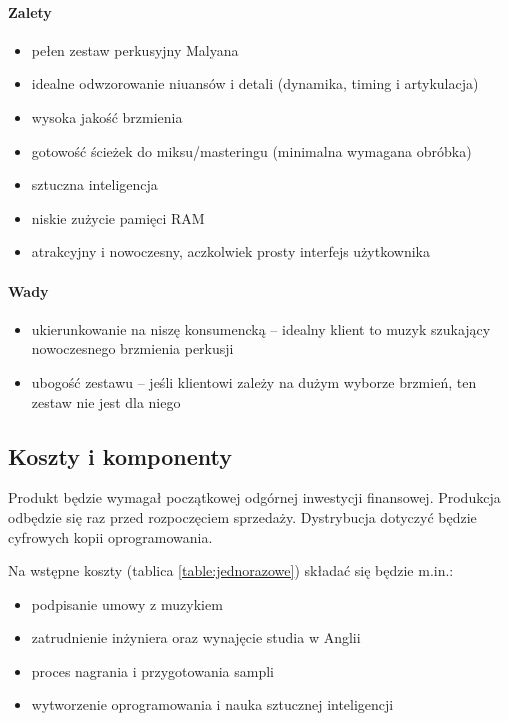 \documentclass[12pt]{article}
\begin{document}
\paragraph{Zalety}

\begin{itemize}
    \item pełen zestaw perkusyjny Malyana
    \item idealne odwzorowanie niuansów i detali (dynamika, timing i artykulacja)
    \item wysoka jakość brzmienia
    \item gotowość ścieżek do miksu/masteringu (minimalna wymagana obróbka)
    \item sztuczna inteligencja
    \item niskie zużycie pamięci RAM
    \item atrakcyjny i nowoczesny, aczkolwiek prosty interfejs użytkownika
\end{itemize}

\paragraph{Wady}

\begin{itemize}
    \item ukierunkowanie na niszę konsumencką -- idealny klient to muzyk szukający nowoczesnego brzmienia perkusji
    \item ubogość zestawu -- jeśli klientowi zależy na dużym wyborze brzmień, ten zestaw nie jest dla niego
\end{itemize}

\subsection{Koszty i komponenty}


Produkt będzie wymagał początkowej odgórnej inwestycji finansowej.
Produkcja odbędzie się raz przed rozpoczęciem sprzedaży.
Dystrybucja dotyczyć będzie cyfrowych kopii oprogramowania.

Na wstępne koszty (tablica \ref{table:jednorazowe}) składać się będzie m.in.:

\begin{itemize}
    \item podpisanie umowy z muzykiem
    \item zatrudnienie inżyniera oraz wynajęcie studia w Anglii
    \item proces nagrania i przygotowania sampli
    \item wytworzenie oprogramowania i nauka sztucznej inteligencji
\end{itemize}
\end{document}
